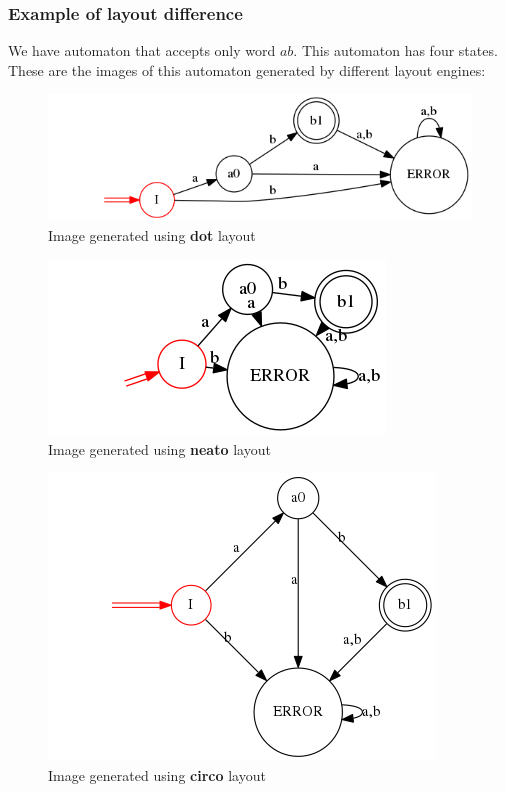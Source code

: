 \documentclass{ctuthesis}
\begin{document}
\subsubsection{Example of layout difference}
We have automaton that accepts only word $ab$. This automaton has four states. These are the images of this automaton generated by different layout engines:

\begin{figure}[H]
\includegraphics[width=1\linewidth]{figures/layouts_dot.png}
\caption{Image generated using \textbf{dot} layout}
\label{fig:layout_diff_dot}
\end{figure}

\begin{figure}[H]
\includegraphics[width=0.5\linewidth]{figures/layouts_neato.png}
\caption{Image generated using \textbf{neato} layout}
\label{fig:layout_diff_neato}
\end{figure}

\begin{figure}[H]
\includegraphics[width=0.8\linewidth]{figures/layouts_circo.png}
\caption{Image generated using \textbf{circo} layout}
\label{fig:layout_diff_circo}
\end{figure}
\end{document}
